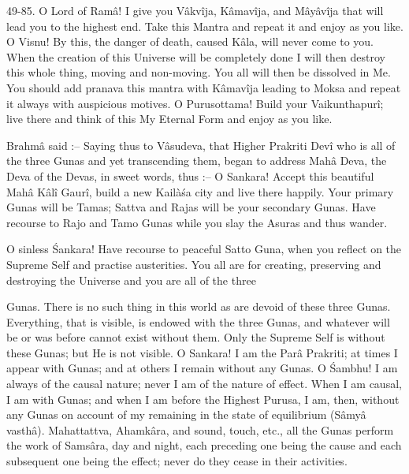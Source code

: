 49-85. O Lord of Ram\^a! I give you V\^akv\^ija, K\^amav\^ija, and M\^ay\^av\^ija that will lead you to the highest end. Take this Mantra and repeat it and enjoy as you like. O Visnu! By this, the danger of death, caused K\^ala, will never come to you. When the creation of this Universe will be completely done I will then destroy this whole thing, moving and non-moving. You all will then be dissolved in Me. You should add pranava this mantra with K\^amav\^ija leading to Moksa and repeat it always with auspicious motives. O Purusottama! Build your Vaikunthapur\^i; live there and think of this My Eternal Form and enjoy as you like.

Brahm\^a said :-- Saying thus to V\^asudeva, that Higher Prakriti Dev\^i who is all of the three Gunas and yet transcending them, began to address Mah\^a Deva, the Deva of the Devas, in sweet words, thus :-- O Sankara! Accept this beautiful Mah\^a K\^al\^i Gaur\^i, build a new Kailà\'sa city and live there happily. Your primary Gunas will be Tamas; Sattva and Rajas will be your secondary Gunas. Have recourse to Rajo and Tamo Gunas while you slay the Asuras and thus wander.

O sinless \'Sankara! Have recourse to peaceful Satto Guna, when you reflect on the Supreme Self and practise austerities. You all are for creating, preserving and destroying the Universe and you are all of the three

Gunas. There is no such thing in this world as are devoid of these three Gunas. Everything, that is visible, is endowed with the three Gunas, and whatever will be or was before cannot exist without them. Only the Supreme Self is without these Gunas; but He is not visible. O Sankara! I am the Par\^a Prakriti; at times I appear with Gunas; and at others I remain without any Gunas. O \'Sambhu! I am always of the causal nature; never I am of the nature of effect. When I am causal, I am with Gunas; and when I am before the Highest Purusa, I am, then, without any Gunas on account of my remaining in the state of equilibrium (S\^amy\^a vasth\^a). Mahattattva, Ahamk\^ara, and sound, touch, etc., all the Gunas perform the work of Sams\^ara, day and night, each preceding one being the cause and each subsequent one being the effect; never do they cease in their activities.

